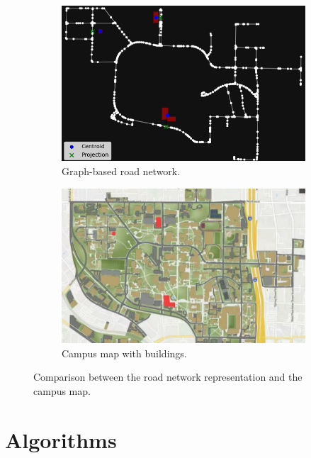 \documentclass[fleqn,10pt]{olplainarticle}
\begin{document}
\begin{figure}[h!]
    \centering
    \begin{subfigure}{0.48\textwidth}
        \centering
        \includegraphics[width=\linewidth]{figures/fig1.png}
        \caption{Graph-based road network.}
        \label{fig:graph}
    \end{subfigure}\hfill
    \begin{subfigure}{0.48\textwidth}
        \centering
        \includegraphics[width=\linewidth]{figures/fig2.jpg}
        \caption{Campus map with buildings.}
        \label{fig:map}
    \end{subfigure}
    \caption{Comparison between the road network representation and the campus map.}
    \label{fig:campus-comparison}
\end{figure}

\section*{Algorithms}
\end{document}
